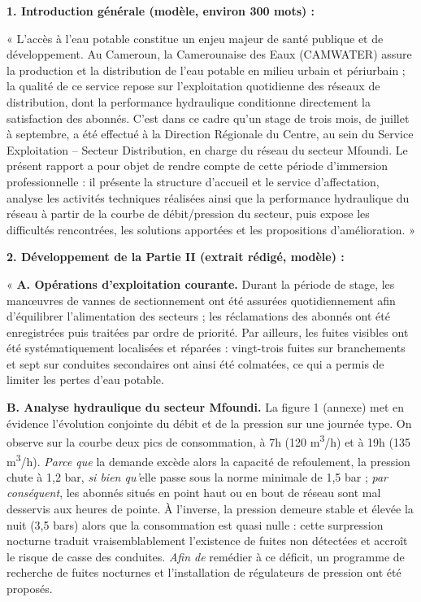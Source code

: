 \documentclass[11pt]{article}
\begin{document}
\begin{corrige}
\textbf{1. Introduction générale (modèle, environ 300 mots) :}

« L'accès à l'eau potable constitue un enjeu majeur de santé publique et de développement. Au Cameroun, la Camerounaise des Eaux (CAMWATER) assure la production et la distribution de l'eau potable en milieu urbain et périurbain ; la qualité de ce service repose sur l'exploitation quotidienne des réseaux de distribution, dont la performance hydraulique conditionne directement la satisfaction des abonnés. C'est dans ce cadre qu'un stage de trois mois, de juillet à septembre, a été effectué à la Direction Régionale du Centre, au sein du Service Exploitation -- Secteur Distribution, en charge du réseau du secteur Mfoundi. Le présent rapport a pour objet de rendre compte de cette période d'immersion professionnelle : il présente la structure d'accueil et le service d'affectation, analyse les activités techniques réalisées ainsi que la performance hydraulique du réseau à partir de la courbe de débit/pression du secteur, puis expose les difficultés rencontrées, les solutions apportées et les propositions d'amélioration. »

\textbf{2. Développement de la Partie II (extrait rédigé, modèle) :}

« \textbf{A. Opérations d'exploitation courante.} Durant la période de stage, les manœuvres de vannes de sectionnement ont été assurées quotidiennement afin d'équilibrer l'alimentation des secteurs ; les réclamations des abonnés ont été enregistrées puis traitées par ordre de priorité. Par ailleurs, les fuites visibles ont été systématiquement localisées et réparées : vingt-trois fuites sur branchements et sept sur conduites secondaires ont ainsi été colmatées, ce qui a permis de limiter les pertes d'eau potable.

\textbf{B. Analyse hydraulique du secteur Mfoundi.} La figure 1 (annexe) met en évidence l'évolution conjointe du débit et de la pression sur une journée type. On observe sur la courbe deux pics de consommation, à 7h (120 m\textsuperscript{3}/h) et à 19h (135 m\textsuperscript{3}/h). \emph{Parce que} la demande excède alors la capacité de refoulement, la pression chute à 1,2 bar, \emph{si bien qu'}elle passe sous la norme minimale de 1,5 bar ; \emph{par conséquent}, les abonnés situés en point haut ou en bout de réseau sont mal desservis aux heures de pointe. À l'inverse, la pression demeure stable et élevée la nuit (3,5 bars) alors que la consommation est quasi nulle : cette surpression nocturne traduit vraisemblablement l'existence de fuites non détectées et accroît le risque de casse des conduites. \emph{Afin de} remédier à ce déficit, un programme de recherche de fuites nocturnes et l'installation de régulateurs de pression ont été proposés.


\end{corrige}
\end{document}

